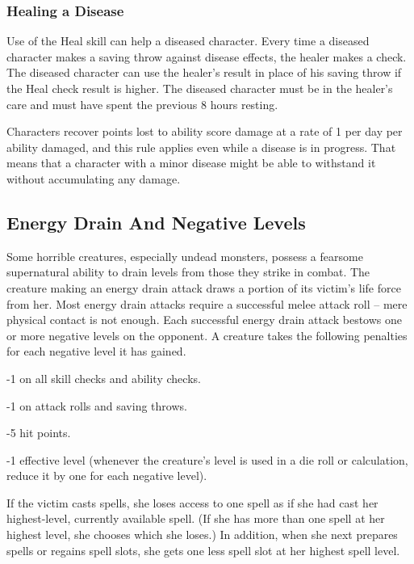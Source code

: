 \subsubsection{Healing a Disease}

Use of the Heal skill can help a diseased character. Every time a diseased character 
makes a saving throw against disease effects, the healer makes a check. The diseased 
character can use the healer's result in place of his saving throw if the Heal 
check result is higher. The diseased character must be in the healer's care and 
must have spent the previous 8 hours resting.

Characters recover points lost to ability score damage at a rate of 1 per day per 
ability damaged, and this rule applies even while a disease is in progress. That 
means that a character with a minor disease might be able to withstand it without 
accumulating any damage.

\subsection{Energy Drain And Negative Levels}

Some horrible creatures, especially undead monsters, possess a fearsome supernatural 
ability to drain levels from those they strike in combat. The creature making an 
energy drain attack draws a portion of its victim's life force from her. Most energy 
drain attacks require a successful melee attack roll -- mere physical contact is 
not enough. Each successful energy drain attack bestows one or more negative levels 
on the opponent. A creature takes the following penalties for each negative level 
it has gained.

\begin{itemize*}
\item -1 on all skill checks and ability checks.
\item -1 on attack rolls and saving throws.
\item -5 hit points.
\item -1 effective level (whenever the creature's level is used in a die roll or calculation, reduce it by one for each negative level).
\end{itemize*}

If the victim casts spells, she loses access to one spell as if she had cast her 
highest-level, currently available spell. (If she has more than one spell at her 
highest level, she chooses which she loses.) In addition, when she next prepares 
spells or regains spell slots, she gets one less spell slot at her highest spell 
level. 

